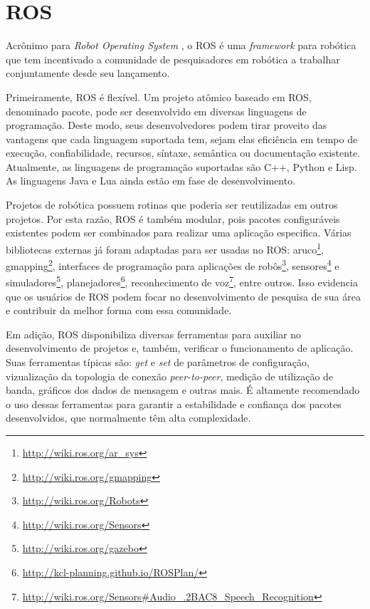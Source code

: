         
        
\chapter[ROS]{ROS} \label{cap:ros}
    
    Acrônimo para \textit{Robot Operating System} \cite{ref:quigley2009ros}, o ROS é uma \textit{framework} para robótica que tem incentivado a comunidade de pesquisadores em robótica a trabalhar conjuntamente desde seu lançamento.
    
    Primeiramente, ROS é flexível. Um projeto atômico baseado em ROS, denominado pacote, pode ser desenvolvido em diversas linguagens de programação. Deste modo, seus desenvolvedores podem tirar proveito das vantagens que cada linguagem suportada tem, sejam elas eficiência em tempo de execução, confiabilidade, recursos, síntaxe, semântica ou documentação existente. Atualmente, as linguagens de programação suportadas são C++, Python e Lisp. As linguagens Java e Lua ainda estão em fase de desenvolvimento.
    
    Projetos de robótica possuem rotinas que poderia ser reutilizadas em outros projetos. Por esta razão, ROS é também modular, pois pacotes configuráveis existentes podem ser combinados para realizar uma aplicação especifica. Várias bibliotecas externas já foram adaptadas para ser usadas no ROS: aruco\footnote{\url{http://wiki.ros.org/ar_sys}}, gmapping\footnote{\url{http://wiki.ros.org/gmapping}}, interfaces de programação para aplicações de robôs\footnote{\url{http://wiki.ros.org/Robots}}, sensores\footnote{\url{http://wiki.ros.org/Sensors}} e simuladores\footnote{\url{http://wiki.ros.org/gazebo}}, planejadores\footnote{\url{http://kcl-planning.github.io/ROSPlan/}}, reconhecimento de voz\footnote{\url{http://wiki.ros.org/Sensors\#Audio_.2BAC8_Speech_Recognition}}, entre outros. Isso evidencia que os usuários de ROS podem focar no desenvolvimento de pesquisa de sua área e contribuir da melhor forma com essa comunidade.
    
    Em adição, ROS disponibiliza diversas ferramentas para auxiliar no desenvolvimento de projetos e, também, verificar o funcionamento de aplicação. Suas ferramentas típicas são: \textit{get} e \textit{set} de parâmetros de configuração, vizualização da topologia de conexão \textit{peer-to-peer}, medição de utilização de banda, gráficos dos dados de mensagem e outras mais. É altamente recomendado o uso dessas ferramentas para garantir a estabilidade e confiança dos pacotes desenvolvidos, que normalmente têm alta complexidade.
    

